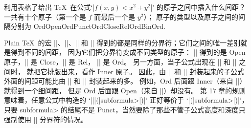 \ddangerexercise 利用表格了给出 \TeX\ 在公式`|$f(x,y)<x^2+y^2$|'%
的原子之间中插入什么间距？
\answer 一共有十个原子（第一个是 $f$ 而最后一个是 $y^2$）；
原子的类型以及原子之间的间隔分别为
\begindisplay \def\0{\thinspace}%
  \def\1{\thinspace{\tt\bslash,}\thinspace}%
  \def\2{\thinspace{\tt\bslash>}\thinspace}%
  \def\3{\thinspace{\tt\bslash;}\thinspace}
Ord\0Open\0Ord\0Punct\1Ord\0Close\3Rel\3Ord\2Bin\2Ord.
\enddisplay

\ddanger Plain \TeX\ 的宏 |\bigl|、|\bigr|、|\bigm| 和 |\big|
得到的都是同样的分界符；它们之间的唯一差别就是得到不同的间距，
因为它们把分界符变成不同类型的原子：
|\bigl| 得到的是 Open 原子，|\bigr| 是 Close，|\bigm| 是 Rel，
|\big| 是 Ord。
另一方面，当子公式出现在 |\left| 和 |\right| 之间时，
就把它排版出来，看作 Inner 原子。
因此，由 |\left| 和 |\right| 封装起来的子公式外面的间距可能比由
|\bigl| 和 |\bigr| 封装起来的多。
例如，Ord 后面跟 Inner（来自 |\left|）就得到一个细间距，
但是 Ord 后面跟 Open（来自 |\bigl|）却没有。
第 17 章的规则意味着，任意公式中构造的
`|\mathinner||{\bigl({|\<subformula>|}\bigr)}|'
正好等价于 `|\left(|\<subformula>|\right)|'，只要 \<subformula>
的结尾不是 Punct，当然要除了那些不管子公式高度和深度只强制使用
|\big| 分界符的情况。

